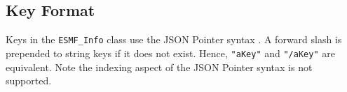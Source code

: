\subsection{Key Format}
\label{info_key_format}
Keys in the \texttt{ESMF\_Info} class use the JSON Pointer syntax \cite{json_for_modern_cpp_json_pointer}. A forward slash is prepended to string keys if it does not exist. Hence, \texttt{"aKey"} and \texttt{"/aKey"} are equivalent. Note the indexing aspect of the JSON Pointer syntax is not supported.